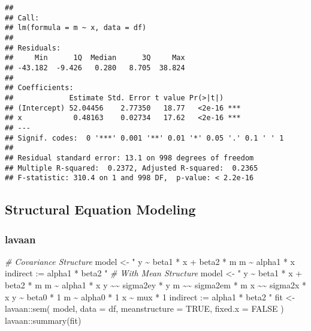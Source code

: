 \documentclass[
]{book}
\newenvironment{Shaded}{\begin{snugshade}}{\end{snugshade}}
\newcommand{\AttributeTok}[1]{\textcolor[rgb]{0.77,0.63,0.00}{#1}}
\newcommand{\CommentTok}[1]{\textcolor[rgb]{0.56,0.35,0.01}{\textit{#1}}}
\newcommand{\ConstantTok}[1]{\textcolor[rgb]{0.00,0.00,0.00}{#1}}
\newcommand{\FunctionTok}[1]{\textcolor[rgb]{0.00,0.00,0.00}{#1}}
\newcommand{\NormalTok}[1]{#1}
\newcommand{\OtherTok}[1]{\textcolor[rgb]{0.56,0.35,0.01}{#1}}
\newcommand{\SpecialCharTok}[1]{\textcolor[rgb]{0.00,0.00,0.00}{#1}}
\newcommand{\StringTok}[1]{\textcolor[rgb]{0.31,0.60,0.02}{#1}}
\theoremstyle{definition}
\theoremstyle{definition}
\theoremstyle{definition}
\theoremstyle{remark}
\begin{document}
\begin{verbatim}
## 
## Call:
## lm(formula = m ~ x, data = df)
## 
## Residuals:
##     Min      1Q  Median      3Q     Max 
## -43.182  -9.426   0.280   8.705  38.824 
## 
## Coefficients:
##             Estimate Std. Error t value Pr(>|t|)    
## (Intercept) 52.04456    2.77350   18.77   <2e-16 ***
## x            0.48163    0.02734   17.62   <2e-16 ***
## ---
## Signif. codes:  0 '***' 0.001 '**' 0.01 '*' 0.05 '.' 0.1 ' ' 1
## 
## Residual standard error: 13.1 on 998 degrees of freedom
## Multiple R-squared:  0.2372, Adjusted R-squared:  0.2365 
## F-statistic: 310.4 on 1 and 998 DF,  p-value: < 2.2e-16
\end{verbatim}

\hypertarget{structural-equation-modeling-2}{%
\subsection{Structural Equation Modeling}\label{structural-equation-modeling-2}}

\hypertarget{lavaan-lavaan2012-2}{%
\subsubsection{\texorpdfstring{lavaan \citep{lavaan2012}}{lavaan {[}@lavaan2012{]}}}\label{lavaan-lavaan2012-2}}

\begin{Shaded}
\begin{Highlighting}[]
\CommentTok{\# Covariance Structure}
\NormalTok{model }\OtherTok{\textless{}{-}} \StringTok{"}
\StringTok{  y \textasciitilde{} beta1 * x + beta2 * m}
\StringTok{  m \textasciitilde{} alpha1 * x}
\StringTok{  indirect := alpha1 * beta2}
\StringTok{"}
\CommentTok{\# With Mean Structure}
\NormalTok{model }\OtherTok{\textless{}{-}} \StringTok{"}
\StringTok{  y \textasciitilde{} beta1 * x + beta2 * m}
\StringTok{  m \textasciitilde{} alpha1 * x}
\StringTok{  y \textasciitilde{}\textasciitilde{} sigma2ey * y}
\StringTok{  m \textasciitilde{}\textasciitilde{} sigma2em * m}
\StringTok{  x \textasciitilde{}\textasciitilde{} sigma2x * x}
\StringTok{  y \textasciitilde{} beta0 * 1}
\StringTok{  m \textasciitilde{} alpha0 * 1}
\StringTok{  x \textasciitilde{} mux * 1}
\StringTok{  indirect := alpha1 * beta2}
\StringTok{"}
\NormalTok{fit }\OtherTok{\textless{}{-}}\NormalTok{ lavaan}\SpecialCharTok{::}\FunctionTok{sem}\NormalTok{(}
\NormalTok{  model,}
  \AttributeTok{data =}\NormalTok{ df,}
  \AttributeTok{meanstructure =} \ConstantTok{TRUE}\NormalTok{,}
  \AttributeTok{fixed.x =} \ConstantTok{FALSE}
\NormalTok{)}
\NormalTok{lavaan}\SpecialCharTok{::}\FunctionTok{summary}\NormalTok{(fit)}
\end{Highlighting}
\end{Shaded}
\end{document}
